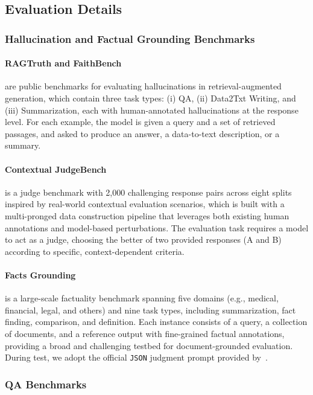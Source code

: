 \documentclass[10pt, a4paper, logo]{googledeepmind} %
\begin{document}
\subsection{Evaluation Details}

\subsubsection{Hallucination and Factual Grounding Benchmarks}\label{app:eval-details-fc}
\paragraph{RAGTruth and FaithBench} are public benchmarks for evaluating hallucinations in retrieval-augmented generation, which contain three task types: (i) QA, (ii) Data2Txt Writing, and (iii) Summarization, each with human-annotated hallucinations at the response level. For each example, the model is given a query and a set of retrieved passages, and asked to produce an answer, a data-to-text description, or a summary. 

\paragraph{Contextual JudgeBench} is a judge benchmark with 2,000 challenging response pairs across eight splits inspired by real-world contextual evaluation scenarios, which is built with a multi-pronged data construction pipeline that leverages both existing human annotations and model-based perturbations. The evaluation task requires a model to act as a judge, choosing the better of two provided responses (A and B) according to specific, context-dependent criteria.

\paragraph{Facts Grounding} is a large-scale factuality benchmark spanning five domains (e.g., medical, financial, legal, and others) and nine task types, including summarization, fact finding, comparison, and definition. Each instance consists of a query, a collection of documents, and a reference output with fine-grained factual annotations, providing a broad and challenging testbed for document-grounded evaluation. During test, we adopt the official \texttt{JSON} judgment prompt provided by~\citet{jacovi2025facts}.

\subsubsection{QA Benchmarks}\label{app:eval-details-qa}
\end{document}
